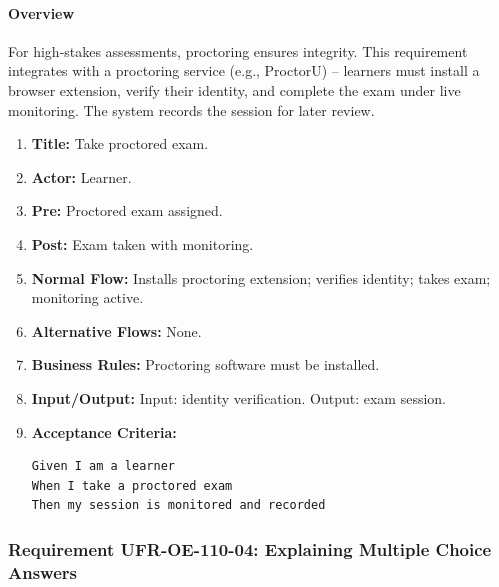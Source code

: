 \paragraph{Overview}
For high‑stakes assessments, proctoring ensures integrity. This requirement integrates with a proctoring service (e.g., ProctorU) – learners must install a browser extension, verify their identity, and complete the exam under live monitoring. The system records the session for later review.
\begin{enumerate}[label=\textbf{\arabic*.}]
\item \textbf{Title:} Take proctored exam.
\item \textbf{Actor:} Learner.
\item \textbf{Pre:} Proctored exam assigned.
\item \textbf{Post:} Exam taken with monitoring.
\item \textbf{Normal Flow:} Installs proctoring extension; verifies identity; takes exam; monitoring active.
\item \textbf{Alternative Flows:} None.
\item \textbf{Business Rules:} Proctoring software must be installed.
\item \textbf{Input/Output:} Input: identity verification. Output: exam session.
\item \textbf{Acceptance Criteria:}
    \begin{verbatim}
Given I am a learner
When I take a proctored exam
Then my session is monitored and recorded
    \end{verbatim}
\end{enumerate}

\subsubsection{Requirement UFR-OE-110-04: Explaining Multiple Choice Answers}
